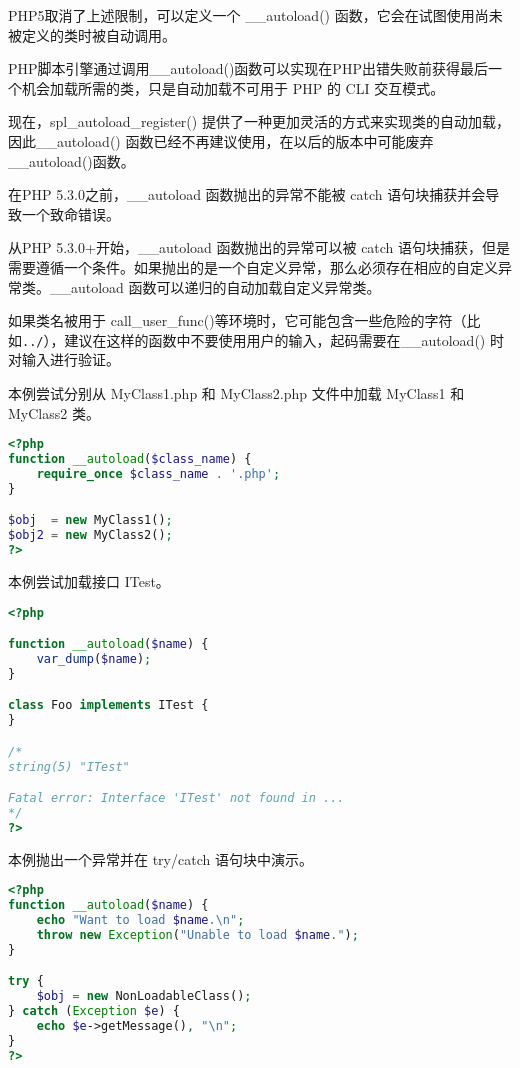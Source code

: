 PHP5取消了上述限制，可以定义一个 \_\_autoload() 函数，它会在试图使用尚未被定义的类时被自动调用。

PHP脚本引擎通过调用\_\_autoload()函数可以实现在PHP出错失败前获得最后一个机会加载所需的类，只是自动加载不可用于 PHP 的 CLI 交互模式。

现在，spl\_autoload\_register() 提供了一种更加灵活的方式来实现类的自动加载，因此\_\_autoload() 函数已经不再建议使用，在以后的版本中可能废弃\_\_autoload()函数。

\begin{compactitem}
\item 在PHP 5.3.0之前，\_\_autoload 函数抛出的异常不能被 catch 语句块捕获并会导致一个致命错误。
\item 从PHP 5.3.0+开始，\_\_autoload 函数抛出的异常可以被 catch 语句块捕获，但是需要遵循一个条件。如果抛出的是一个自定义异常，那么必须存在相应的自定义异常类。\_\_autoload 函数可以递归的自动加载自定义异常类。
\end{compactitem}

如果类名被用于 call\_user\_func()等环境时，它可能包含一些危险的字符（比如\texttt{../}），建议在这样的函数中不要使用用户的输入，起码需要在\_\_autoload() 时对输入进行验证。

本例尝试分别从 MyClass1.php 和 MyClass2.php 文件中加载 MyClass1 和 MyClass2 类。

\begin{lstlisting}[language=PHP]
<?php
function __autoload($class_name) {
    require_once $class_name . '.php';
}

$obj  = new MyClass1();
$obj2 = new MyClass2();
?>
\end{lstlisting}


本例尝试加载接口 ITest。


\begin{lstlisting}[language=PHP]
<?php

function __autoload($name) {
    var_dump($name);
}

class Foo implements ITest {
}

/*
string(5) "ITest"

Fatal error: Interface 'ITest' not found in ...
*/
?>
\end{lstlisting}

本例抛出一个异常并在 try/catch 语句块中演示。




\begin{lstlisting}[language=PHP]
<?php
function __autoload($name) {
    echo "Want to load $name.\n";
    throw new Exception("Unable to load $name.");
}

try {
    $obj = new NonLoadableClass();
} catch (Exception $e) {
    echo $e->getMessage(), "\n";
}
?>
\end{lstlisting}

